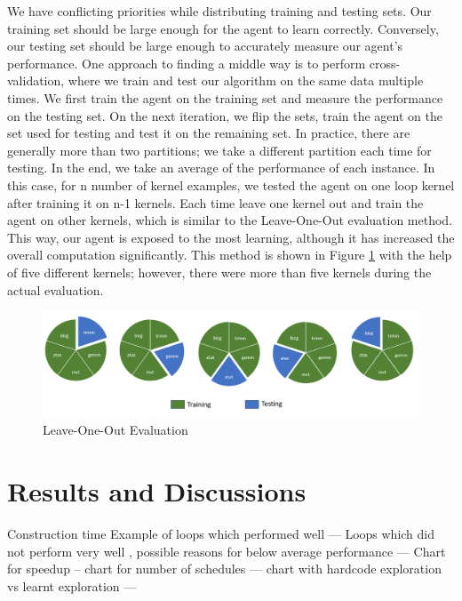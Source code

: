 \documentclass[logo,msc]{infthesis}           %
\begin{document}
We have conflicting priorities while distributing training and testing sets. Our training set should be large enough for the agent to learn correctly. Conversely, our testing set should be large enough to accurately measure our agent's performance. One approach to finding a middle way is to perform cross-validation, where we train and test our algorithm on the same data multiple times. We first train the agent on the training set and measure the performance on the testing set. On the next iteration, we flip the sets, train the agent on the set used for testing and test it on the remaining set. In practice, there are generally more than two partitions; we take a different partition each time for testing. In the end, we take an average of the performance of each instance. In this case, for n number of kernel examples, we tested the agent on one loop kernel after training it on n-1 kernels. Each time leave one kernel out and train the agent on other kernels, which is similar to the Leave-One-Out evaluation method\cite{inbook}. This way, our agent is exposed to the most learning, although it has increased the overall computation significantly. This method is shown in Figure \ref{fig:leave_one_out} with the help of five different kernels; however, there were more than five kernels during the actual evaluation.

\begin{figure}[htbp]
  \centering
  \includegraphics[width=\textwidth]{Images/Leave_One_Out.png}   
  \caption{Leave-One-Out Evaluation}
  \label{fig:leave_one_out} 
\end{figure}

\chapter{Results and Discussions}
Construction time
Example of loops which performed well ---
Loops which did not perform very well , possible reasons for below average performance --- 
Chart for speedup -- 
chart for number of schedules ---
chart with hardcode exploration vs learnt exploration ---
\end{document}

